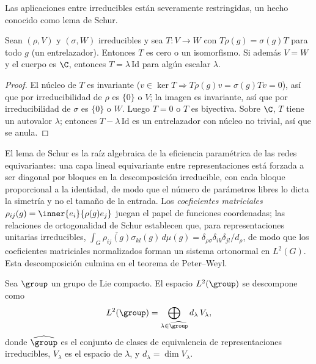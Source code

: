 Las aplicaciones entre irreducibles est\'an severamente restringidas, un hecho
conocido como lema de Schur.

\begin{lemma}[Schur]
\label{lem:found:schur}
Sean $(\rho, V)$ y $(\sigma, W)$ irreducibles y sea $T : V \to W$ con
$T\rho(g) = \sigma(g)T$ para todo $g$ (un entrelazador). Entonces $T$ es cero o un
isomorfismo. Si adem\'as $V = W$ y el cuerpo es $\C$, entonces
$T = \lambda\,\mathrm{Id}$ para alg\'un escalar $\lambda$.
\end{lemma}

\begin{proof}
El n\'ucleo de $T$ es invariante ($v \in \ker T \Rightarrow T\rho(g)v =
\sigma(g)Tv = 0$), as\'i que por irreducibilidad de $\rho$ es $\{0\}$ o $V$; la
imagen es invariante, as\'i que por irreducibilidad de $\sigma$ es $\{0\}$ o $W$.
Luego $T = 0$ o $T$ es biyectiva. Sobre $\C$, $T$ tiene un autovalor $\lambda$;
entonces $T - \lambda\,\mathrm{Id}$ es un entrelazador con n\'ucleo no trivial, as\'i
que se anula.
\end{proof}

El lema de Schur es la ra\'iz algebraica de la eficiencia param\'etrica de las redes
equivariantes: una capa lineal equivariante entre representaciones est\'a forzada a
ser diagonal por bloques en la descomposici\'on irreducible, con cada bloque
proporcional a la identidad, de modo que el n\'umero de par\'ametros libres lo dicta
la simetr\'ia y no el tama\~no de la entrada. Los \emph{coeficientes matriciales}
$\rho_{ij}(g) = \inner{e_i}{\rho(g)e_j}$ juegan el papel de funciones coordenadas;
las relaciones de ortogonalidad de Schur establecen que, para representaciones
unitarias irreducibles, $\int_G \overline{\rho_{ij}(g)}\sigma_{kl}(g)\, d\mu(g) =
\delta_{\rho\sigma}\delta_{ik}\delta_{jl}/d_\rho$, de modo que los coeficientes
matriciales normalizados forman un sistema ortonormal en $L^2(G)$. Esta
descomposici\'on culmina en el teorema de Peter--Weyl.

\begin{theorem}
\label{thm:found:peterweyl}
Sea $\group$ un grupo de Lie compacto. El espacio $L^2(\group)$ se descompone como
\[
  L^2(\group) = \bigoplus_{\lambda \in \widehat{\group}} d_\lambda\, V_\lambda,
\]
donde $\widehat{\group}$ es el conjunto de clases de equivalencia de
representaciones irreducibles, $V_\lambda$ es el espacio de $\lambda$, y $d_\lambda
= \dim V_\lambda$.
\end{theorem}

